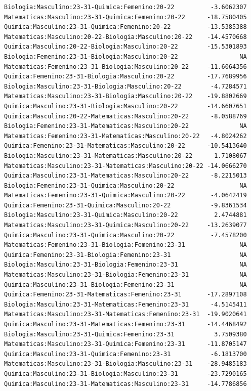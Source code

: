 \documentclass{rapport}
\begin{document}
\begin{itemize}
\begin{verbatim}
Biologia:Masculino:23-31-Quimica:Femenino:20-22          -3.6062307
Matematicas:Masculino:23-31-Quimica:Femenino:20-22      -18.7580405
Quimica:Masculino:23-31-Quimica:Femenino:20-22          -13.5385388
Matematicas:Masculino:20-22-Biologia:Masculino:20-22    -14.4570668
Quimica:Masculino:20-22-Biologia:Masculino:20-22        -15.5301893
Biologia:Femenino:23-31-Biologia:Masculino:20-22                 NA
Matematicas:Femenino:23-31-Biologia:Masculino:20-22     -11.6064356
Quimica:Femenino:23-31-Biologia:Masculino:20-22         -17.7689956
Biologia:Masculino:23-31-Biologia:Masculino:20-22        -4.7284571
Matematicas:Masculino:23-31-Biologia:Masculino:20-22    -19.8802669
Quimica:Masculino:23-31-Biologia:Masculino:20-22        -14.6607651
Quimica:Masculino:20-22-Matematicas:Masculino:20-22      -8.0588769
Biologia:Femenino:23-31-Matematicas:Masculino:20-22              NA
Matematicas:Femenino:23-31-Matematicas:Masculino:20-22   -4.8024262
Quimica:Femenino:23-31-Matematicas:Masculino:20-22      -10.5413640
Biologia:Masculino:23-31-Matematicas:Masculino:20-22      1.7108067
Matematicas:Masculino:23-31-Matematicas:Masculino:20-22 -14.0666270
Quimica:Masculino:23-31-Matematicas:Masculino:20-22      -8.2215013
Biologia:Femenino:23-31-Quimica:Masculino:20-22                  NA
Matematicas:Femenino:23-31-Quimica:Masculino:20-22       -4.0642419
Quimica:Femenino:23-31-Quimica:Masculino:20-22           -9.8361534
Biologia:Masculino:23-31-Quimica:Masculino:20-22          2.4744881
Matematicas:Masculino:23-31-Quimica:Masculino:20-22     -13.2639077
Quimica:Masculino:23-31-Quimica:Masculino:20-22          -7.4578200
Matematicas:Femenino:23-31-Biologia:Femenino:23-31               NA
Quimica:Femenino:23-31-Biologia:Femenino:23-31                   NA
Biologia:Masculino:23-31-Biologia:Femenino:23-31                 NA
Matematicas:Masculino:23-31-Biologia:Femenino:23-31              NA
Quimica:Masculino:23-31-Biologia:Femenino:23-31                  NA
Quimica:Femenino:23-31-Matematicas:Femenino:23-31       -17.2897108
Biologia:Masculino:23-31-Matematicas:Femenino:23-31      -4.5145411
Matematicas:Masculino:23-31-Matematicas:Femenino:23-31  -19.9020641
Quimica:Masculino:23-31-Matematicas:Femenino:23-31      -14.4468492
Biologia:Masculino:23-31-Quimica:Femenino:23-31           3.7509380
Matematicas:Masculino:23-31-Quimica:Femenino:23-31      -11.8705147
Quimica:Masculino:23-31-Quimica:Femenino:23-31           -6.1813700
Matematicas:Masculino:23-31-Biologia:Masculino:23-31    -28.9485183
Quimica:Masculino:23-31-Biologia:Masculino:23-31        -23.7290165
Quimica:Masculino:23-31-Matematicas:Masculino:23-31     -14.7786856

\end{verbatim}
\end{itemize}
\end{document}
